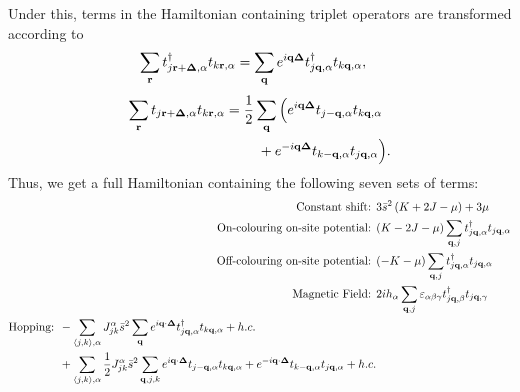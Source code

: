 Under this, terms in the Hamiltonian containing triplet operators are transformed according to
\begin{align}
    \sum_{\textbf r} 
    t^\dag_{j \textbf r + \bm \Delta , \alpha} 
    t_{k \textbf r, \alpha} & = 
    \sum_{\textbf q} e^{i \textbf q \bm \Delta} 
    t_{j \textbf q, \alpha}^\dag
    t_{k \textbf q, \alpha}, 
\end{align}
\begin{align} \begin{split}
    \sum_{\textbf r} 
    t_{j \textbf r + \bm \Delta , \alpha} 
    t_{k \textbf r, \alpha} & = 
    \frac{1}{2}
    \sum_{\textbf q} \Big (
    e^{i \textbf q \bm \Delta} 
    t_{j -\textbf q, \alpha}
    t_{k \textbf q, \alpha} \\
    & \qquad \ + 
    e^{-i \textbf q \bm \Delta} 
    t_{k -\textbf q, \alpha}
    t_{j \textbf q, \alpha} 
    \Big ).
\end{split}
\end{align}
Thus, we get a full Hamiltonian containing the following seven sets of terms:
\begin{align}
        \textup{Constant shift: } 
        & 3\bar s^2 \left ( K + 2J -\mu \right ) + 3\mu 
        \\ 
        \textup{On-colouring on-site potential: } 
        & (K - 2J - \mu) \sum_{\textbf q, j} 
        t^\dag _{j \textbf q, \alpha }  t_{j \textbf q, \alpha } 
        \\
        \textup{Off-colouring on-site potential: } 
        & (- K - \mu) \sum_{\textbf q, j} 
        t^\dag _{j \textbf q, \alpha }  t_{j \textbf q, \alpha } 
        \\ 
        \textup{Magnetic Field: } 
        & 2ih_\alpha \sum_{\textbf q,j}\varepsilon_{\alpha \beta \gamma} t^\dag_{j\textbf q,\beta} t_{j\textbf q,\gamma} 
        \\
        \begin{split}
        \textup{Hopping: } & -
        \sum_{\braket{j,k},\alpha} 
        J^\alpha _{jk} \bar s^2 
        \sum_{\textbf q} e^{i \textbf q \cdot \bm \Delta}
        t_{j \textbf q, \alpha}^\dag t_{k \textbf q, \alpha}  + h.c.
        \\
        & +\sum_{\braket{j,k},\alpha} 
        \frac{1}{2} J^\alpha _{jk}  \bar s^2 \sum_{\textbf q,j,k} 
        e^{i \textbf q \cdot \bm \Delta}
        t_{j -\textbf q, \alpha}t_{k \textbf q, \alpha} + 
        e^{-i \textbf q \cdot \bm \Delta}
        t_{k -\textbf q, \alpha}t_{j \textbf q, \alpha} + h.c.
    \end{split}
    \end{align}
